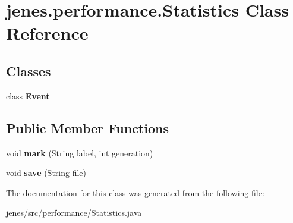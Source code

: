 \hypertarget{classjenes_1_1performance_1_1_statistics}{\section{jenes.\-performance.\-Statistics Class Reference}
\label{classjenes_1_1performance_1_1_statistics}
}
\subsection*{Classes}
\begin{DoxyCompactItemize}
\item 
class {\bfseries Event}
\end{DoxyCompactItemize}
\subsection*{Public Member Functions}
\begin{DoxyCompactItemize}
\item 
\hypertarget{classjenes_1_1performance_1_1_statistics_a99898ca71f17c19122bad26663e1fad5}{void {\bfseries mark} (String label, int generation)}\label{classjenes_1_1performance_1_1_statistics_a99898ca71f17c19122bad26663e1fad5}

\item 
\hypertarget{classjenes_1_1performance_1_1_statistics_a3d1d4790dfe7b6e6d59fb5d1027daec7}{void {\bfseries save} (String file)}\label{classjenes_1_1performance_1_1_statistics_a3d1d4790dfe7b6e6d59fb5d1027daec7}

\end{DoxyCompactItemize}


The documentation for this class was generated from the following file\-:\begin{DoxyCompactItemize}
\item 
jenes/src/performance/Statistics.\-java\end{DoxyCompactItemize}
